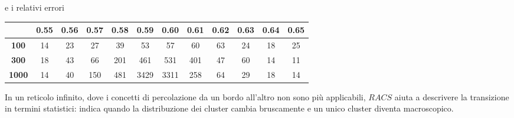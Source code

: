 \vspace{15px}
\noindent
e i relativi errori

\vspace{15px}
\noindent
\begin{tabular}{|c|*{11}{c|}}
	\hline
	\textbf{} & \textbf{0.55} & \textbf{0.56} & \textbf{0.57} & \textbf{0.58} & \textbf{0.59} & \textbf{0.60} & \textbf{0.61} & \textbf{0.62} & \textbf{0.63} & \textbf{0.64} & \textbf{0.65} \\
	\hline
	\textbf{100}  & 14 & 23 & 27 & 39 & 53 & 57 & 60 & 63 & 24 & 18 & 25 \\
	\hline
	\textbf{300}  & 18 & 43 & 66 & 201 & 461 & 531 & 401 & 47 & 60 & 14 & 11 \\
	\hline
	\textbf{1000} & 14 & 40 & 150 & 481 & 3429 & 3311 & 258 & 64 & 29 & 18 & 14 \\
	\hline
\end{tabular}

\vspace{15px}
\noindent
In un reticolo infinito, dove i concetti di percolazione da un bordo all’altro non sono più applicabili, $RACS$ aiuta a descrivere la transizione in termini statistici: indica quando la distribuzione dei cluster cambia bruscamente e un unico cluster diventa macroscopico.